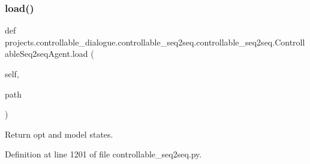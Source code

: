 \subsubsection{\texorpdfstring{load()}{load()}}
{\footnotesize\ttfamily def projects.\+controllable\+\_\+dialogue.\+controllable\+\_\+seq2seq.\+controllable\+\_\+seq2seq.\+Controllable\+Seq2seq\+Agent.\+load (\begin{DoxyParamCaption}\item[{}]{self,  }\item[{}]{path }\end{DoxyParamCaption})}

\begin{DoxyVerb}Return opt and model states.
\end{DoxyVerb}
 

Definition at line 1201 of file controllable\+\_\+seq2seq.\+py.


